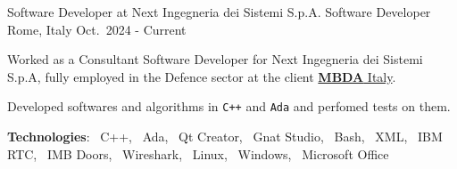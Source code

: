 

\begin{cventries}


    \cventry
    {Software Developer at Next Ingegneria dei Sistemi S.p.A.}
    {Software Developer}
    {Rome, Italy}
    {Oct.\ 2024 - Current}
    {
        \begin{cvitems} %
            \item Worked as a Consultant Software Developer for Next Ingegneria dei Sistemi S.p.A, fully employed in the Defence sector at the client \href{https://www.mbda-systems.com/country-it?rc=1}{\textbf{MBDA} Italy}.
            \item Developed softwares and algorithms in \texttt{C++} and \texttt{Ada} and perfomed tests on them.
            \item[] \textbf{\textcolor{awesome-red}{Tec}hnologies}: \cpplogo{}~C++, \adalogo{}~Ada, \qtlogo{}~Qt Creator, \gnatlogo{}~Gnat Studio, \bashlogo{}~Bash, \xmllogo{}~XML, \rtclogo{}~IBM RTC, \doorslogo{}~IMB Doors, \wiresharklogo{}~Wireshark, \linuxlogo{}~Linux, \windowslogo{}~Windows, \officelogo{}~Microsoft Office
        \end{cvitems}
    }

    

\end{cventries}
